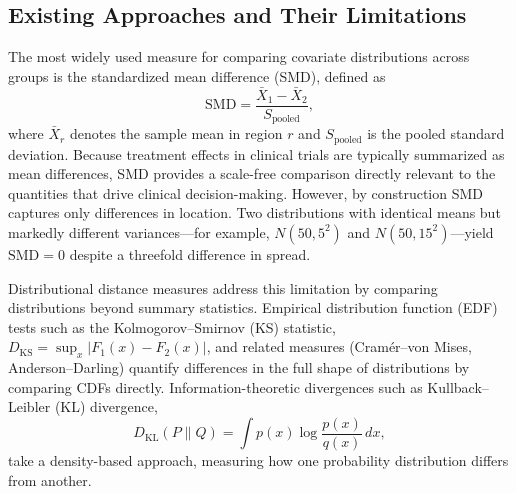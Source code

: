 \documentclass[AMA,Times1COL]{WileyNJDv5}
\begin{document}
\subsection{Existing Approaches and Their Limitations}\label{sec:existing}

The most widely used measure for comparing covariate distributions across groups is the standardized mean difference (SMD), defined as
\begin{equation}
\text{SMD} = \frac{\bar{X}_1 - \bar{X}_2}{S_{\text{pooled}}},
\label{eq:smd}
\end{equation}
where $\bar{X}_r$ denotes the sample mean in region $r$ and $S_{\text{pooled}}$ is the pooled standard deviation.\cite{austin2011} Because treatment effects in clinical trials are typically summarized as mean differences, SMD provides a scale-free comparison directly relevant to the quantities that drive clinical decision-making. However, by construction SMD captures only differences in location. Two distributions with identical means but markedly different variances---for example, $N(50, 5^2)$ and $N(50, 15^2)$---yield $\text{SMD} = 0$ despite a threefold difference in spread.

Distributional distance measures address this limitation by comparing distributions beyond summary statistics. Empirical distribution function (EDF) tests such as the Kolmogorov--Smirnov (KS) statistic, $D_{\text{KS}} = \sup_x |F_1(x) - F_2(x)|$, and related measures (Cram\'{e}r--von Mises, Anderson--Darling) quantify differences in the full shape of distributions by comparing CDFs directly. Information-theoretic divergences such as Kullback--Leibler (KL) divergence,
\begin{equation}
D_{\text{KL}}(P \| Q) = \int p(x) \log \frac{p(x)}{q(x)} \, dx,
\label{eq:kl}
\end{equation}
take a density-based approach, measuring how one probability distribution differs from another.
\end{document}
